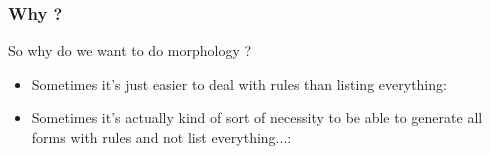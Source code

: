 \documentclass[10pt,xetex]{beamer} %
\begin{document}
\begin{frame}
  \frametitle{Why ?}

So why do we want to do morphology ?  \\
\begin{itemize}
    \item Sometimes it's just easier to deal with rules than listing everything:
    \item<2> Sometimes it's actually kind of sort of necessity to be able to
        generate all forms with rules and not list everything...:
\end{itemize}
\end{frame}
\end{document}
